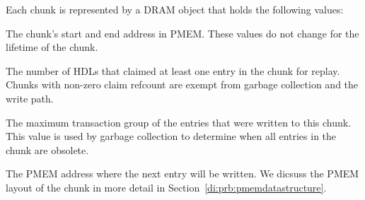 \documentclass[12pt,a4paper,twoside]{book}
\begin{document}
Each chunk is represented by a DRAM object that holds the following values:
\begin{description}[noitemsep]
    \item[PMEM location] The chunk's start and end address in PMEM. These values do not change for the lifetime of the chunk.
    \item[Claim refcount] The number of HDLs that claimed at least one entry in the chunk for replay.
        Chunks with non-zero claim refcount are exempt from garbage collection and the write path.
    \item[Max txg] The maximum transaction group of the entries that were written to this chunk.
        This value is used by garbage collection to determine when all entries in the chunk are obsolete.
    \item[Write position] The PMEM address where the next entry will be written.
        We dicsuss the PMEM layout of the chunk in more detail in Section~\ref{di:prb:pmemdatastructure}.
\end{description}
\end{document}
